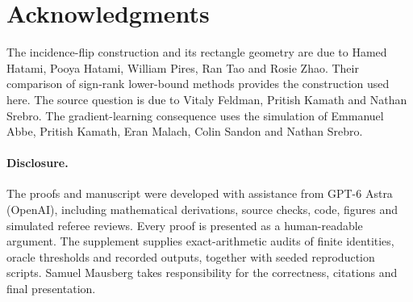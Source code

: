 \section*{Acknowledgments}
The incidence-flip construction and its rectangle geometry are due to Hamed Hatami, Pooya Hatami, William Pires, Ran Tao and Rosie Zhao. Their comparison of sign-rank lower-bound methods provides the construction used here. The source question is due to Vitaly Feldman, Pritish Kamath and Nathan Srebro. The gradient-learning consequence uses the simulation of Emmanuel Abbe, Pritish Kamath, Eran Malach, Colin Sandon and Nathan Srebro.

\paragraph{Disclosure.}
The proofs and manuscript were developed with assistance from GPT-6 Astra (OpenAI), including mathematical derivations, source checks, code, figures and simulated referee reviews. Every proof is presented as a human-readable argument. The supplement supplies exact-arithmetic audits of finite identities, oracle thresholds and recorded outputs, together with seeded reproduction scripts. Samuel Mausberg takes responsibility for the correctness, citations and final presentation.
